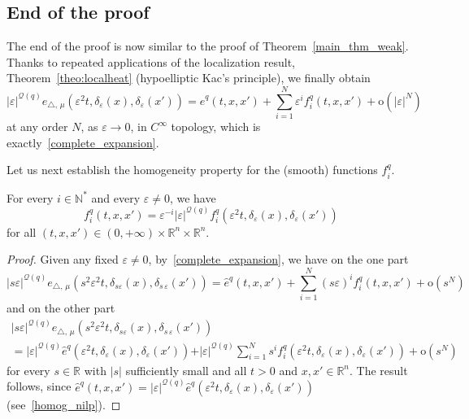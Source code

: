 \documentclass[AHL,Unicode,published]{cedram}
\newcommand*\R{\mathbb{R}}
\newcommand*\N{\mathbb{N}}
\newcommand{\calQ}{\mathcal{Q}}
\newcommand{\rmo}{\mathrm{o}}
\begin{document}
\subsection{End of the proof}\label{end_of_the_proof_main_thm}
The end of the proof is now similar to the proof of Theorem~\ref{main_thm_weak}. Thanks to repeated applications of the localization result, Theorem~\ref{theo:localheat} (hypoelliptic Kac's principle), we finally obtain
\[
\vert\varepsilon\vert^{\calQ(q)} e_{\triangle,\,\mu}\left(\varepsilon^2t,\delta_\varepsilon(x),\delta_\varepsilon(x')\right) = \widehat{e}^{q}(t,x,x') + \sum_{i=1}^N \varepsilon^i f_i^{q}(t,x,x') +\rmo\left(\vert\varepsilon\vert^N\right)
\]
at any order $N$, as $\varepsilon\rightarrow 0$, in $C^\infty$ topology, which is exactly~\eqref{complete_expansion}.

Let us next establish the homogeneity property for the (smooth) functions $f^{q}_i$.

\begin{lemm}\label{lem_fi}
For every $i\in\N^*$ and every $\varepsilon\neq 0$, we have
\[
f^{q}_i(t,x,x') = \varepsilon^{-i} \vert\varepsilon\vert^{\calQ(q)} f^{q}_i\left(\varepsilon^2 t,\delta_\varepsilon(x),\delta_\varepsilon(x')\right)
\]
for all $(t,x,x')\in(0,+\infty)\times\R^n\times\R^n$.
\end{lemm}

\begin{proof}
Given any fixed $\varepsilon\neq 0$, by~\eqref{complete_expansion}, we have on the one part
\[
\vert s\varepsilon\vert^{\calQ(q)} e_{\triangle,\,\mu} \left(s^2\varepsilon^2 t, \delta_{s\varepsilon}(x), \delta_{s\,\varepsilon}(x')\right) = \widehat{e}^{q}(t,x,x') + \sum_{i=1}^N (s\varepsilon)^i f^{q}_i(t,x,x') +\rmo\left(s^N\right)
\]
and on the other part
\begin{multline*}
\vert s\varepsilon\vert^{\calQ(q)} e_{\triangle,\,\mu} \left(s^2\varepsilon^2 t, \delta_{s\varepsilon}(x), \delta_{s\,\varepsilon}(x')\right)\\
 = \vert \varepsilon\vert^{\calQ(q)} \widehat{e}^{q}\left(\varepsilon^2 t,\delta_\varepsilon(x),\delta_\varepsilon(x')\right) 
+ \vert \varepsilon\vert^{\calQ(q)} \sum_{i=1}^N s^i f^{q}_i\left(\varepsilon^2 t,\delta_\varepsilon(x),\delta_\varepsilon(x')\right) +\rmo\left(s^N\right)
\end{multline*}
for every $s\in\R$ with $\vert s\vert$ sufficiently small and all $t>0$ and $x,x'\in\R^n$. The result follows, since $\widehat{e}^{q}(t,x,x') = \vert \varepsilon\vert^{\calQ(q)} \widehat{e}^{q}(\varepsilon^2 t,\delta_\varepsilon(x),\delta_\varepsilon(x'))$ (see~\eqref{homog_nilp}).
\end{proof}
\end{document}
